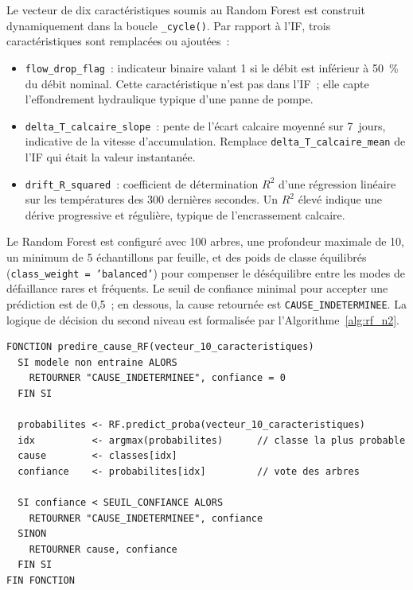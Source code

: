 Le vecteur de dix caractéristiques soumis au Random Forest est construit dynamiquement dans la boucle \texttt{\_cycle()}. Par rapport à l'IF, trois caractéristiques sont remplacées ou ajoutées~:

\begin{itemize}
  \item \texttt{flow\_drop\_flag}~: indicateur binaire valant 1 si le débit est inférieur à 50~\% du débit nominal. Cette caractéristique n'est pas dans l'IF~; elle capte l'effondrement hydraulique typique d'une panne de pompe.
  \item \texttt{delta\_T\_calcaire\_slope}~: pente de l'écart calcaire moyenné sur 7~jours, indicative de la vitesse d'accumulation. Remplace \texttt{delta\_T\_calcaire\_mean} de l'IF qui était la valeur instantanée.
  \item \texttt{drift\_R\_squared}~: coefficient de détermination \(R^2\) d'une régression linéaire sur les températures des 300 dernières secondes. Un \(R^2\) élevé indique une dérive progressive et régulière, typique de l'encrassement calcaire.
\end{itemize}

Le Random Forest est configuré avec 100 arbres, une profondeur maximale de 10, un minimum de 5 échantillons par feuille, et des poids de classe équilibrés (\texttt{class\_weight = 'balanced'}) pour compenser le déséquilibre entre les modes de défaillance rares et fréquents. Le seuil de confiance minimal pour accepter une prédiction est de 0,5~; en dessous, la cause retournée est \texttt{CAUSE\_INDETERMINEE}. La logique de décision du second niveau est formalisée par l'Algorithme~\ref{alg:rf_n2}.

\begin{algorithm}[htbp]
\caption{Classification de la cause par le Random Forest (niveau N2)}
\label{alg:rf_n2}
\begin{minipage}{0.95\textwidth}
\footnotesize
\begin{verbatim}
FONCTION predire_cause_RF(vecteur_10_caracteristiques)
  SI modele non entraine ALORS
    RETOURNER "CAUSE_INDETERMINEE", confiance = 0
  FIN SI

  probabilites <- RF.predict_proba(vecteur_10_caracteristiques)
  idx          <- argmax(probabilites)      // classe la plus probable
  cause        <- classes[idx]
  confiance    <- probabilites[idx]         // vote des arbres

  SI confiance < SEUIL_CONFIANCE ALORS
    RETOURNER "CAUSE_INDETERMINEE", confiance
  SINON
    RETOURNER cause, confiance
  FIN SI
FIN FONCTION
\end{verbatim}
\end{minipage}
\end{algorithm}

